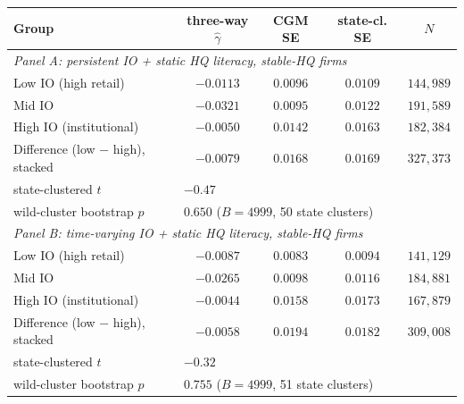 \begin{tabular}{lcccc}
\hline\hline
Group & three-way $\hat\gamma$ & CGM SE & state-cl. SE & $N$ \\
\hline
\multicolumn{5}{l}{\textit{Panel A: persistent IO + static HQ literacy, stable-HQ firms}} \\
Low IO (high retail) & $-0.0113$ & $0.0096$ & $0.0109$ & $144,989$ \\
Mid IO & $-0.0321$ & $0.0095$ & $0.0122$ & $191,589$ \\
High IO (institutional) & $-0.0050$ & $0.0142$ & $0.0163$ & $182,384$ \\
Difference (low $-$ high), stacked & $-0.0079$ & $0.0168$ & $0.0169$ & $327,373$ \\
\quad state-clustered $t$ & \multicolumn{4}{l}{$-0.47$} \\
\quad wild-cluster bootstrap $p$ & \multicolumn{4}{l}{$0.650$ ($B=4999$, 50 state clusters)} \\
\hline
\multicolumn{5}{l}{\textit{Panel B: time-varying IO + static HQ literacy, stable-HQ firms}} \\
Low IO (high retail) & $-0.0087$ & $0.0083$ & $0.0094$ & $141,129$ \\
Mid IO & $-0.0265$ & $0.0098$ & $0.0116$ & $184,881$ \\
High IO (institutional) & $-0.0044$ & $0.0158$ & $0.0173$ & $167,879$ \\
Difference (low $-$ high), stacked & $-0.0058$ & $0.0194$ & $0.0182$ & $309,008$ \\
\quad state-clustered $t$ & \multicolumn{4}{l}{$-0.32$} \\
\quad wild-cluster bootstrap $p$ & \multicolumn{4}{l}{$0.755$ ($B=4999$, 51 state clusters)} \\
\hline\hline
\end{tabular}

